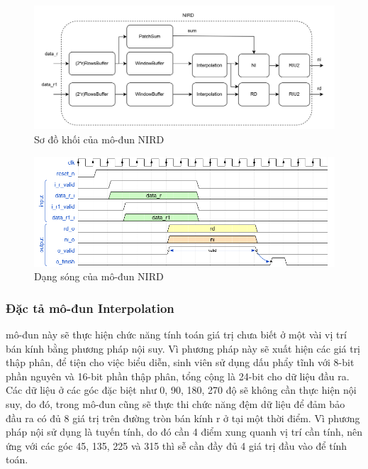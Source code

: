 \begin{figure}[!ht]
    \centering
    \includegraphics[width=\linewidth]{figures/nirdArch.png}
    \caption{Sơ đồ khối của mô-đun NIRD}
    \label{fig:nirdArch}
\end{figure}
\begin{figure}[!ht]
    \centering
    \includegraphics[width=\linewidth]{figures/nird.png}
    \caption{Dạng sóng của mô-đun NIRD}
    \label{fig:nird}
\end{figure}

\subsubsection{Đặc tả mô-đun Interpolation}
mô-đun này sẽ thực hiện chức năng tính toán giá trị chưa biết ở một vài vị trí bán kính bằng phương pháp nội suy. Vì phương pháp này sẽ xuất hiện các giá trị thập phân, để tiện cho việc biểu diễn, sinh viên sử dụng dấu phẩy tĩnh với 8-bit phần nguyên và 16-bit phần thập phân, tổng cộng là 24-bit cho dữ liệu đầu ra. Các dữ liệu ở các góc đặc biệt như 0, 90, 180, 270 độ sẽ không cần thực hiện nội suy, do đó, trong mô-đun cũng sẽ thực thi chức năng đệm dữ liệu để đảm bảo đầu ra có đủ 8 giá trị trên đường tròn bán kính r ở tại một thời điểm. Vì phương pháp nội sử dụng là tuyến tính, do đó cần 4 điểm xung quanh vị trí cần tính, nên ứng với các góc 45, 135, 225 và 315 thì sễ cần đầy đủ 4 giá trị đầu vào để tính toán.

